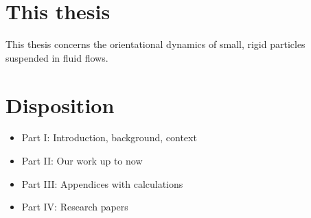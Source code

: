 \documentclass[thesis.tex]{subfiles}
\begin{document}
\section*{This thesis}

This thesis concerns the orientational dynamics of small, rigid particles suspended in fluid flows. 

\section*{Disposition}

\begin{itemize}
	\item Part I: Introduction, background, context
	\item Part II: Our work up to now
	\item Part III: Appendices with calculations
	\item Part IV: Research papers
\end{itemize}
\end{document}
